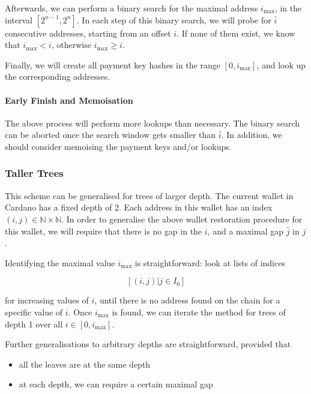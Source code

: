 \documentclass[11pt,a4paper,dvipsnames,twosided]{article}
\begin{document}
Afterwards, we can perform a binary search for the maximal address
\(i_\text{max}\), in the interval \([2^{n-1}, 2^n]\). In each step of
this binary search, we will probe for \(\bar{i}\) consecutive addresses,
starting from an offset \(i\). If none of them exist, we know that
\(i_\text{max} < i\), otherwise \(i_\text{max} \geq i\).

Finally, we will create all payment key hashes in the range
\([0, i_\text{max}]\), and look up the corresponding addresses.

\paragraph{Early Finish and Memoisation}

The above process will perform more lookups than necessary. The binary
search can be aborted once the search window gets smaller than
\(\bar{i}\). In addition, we should consider memoising the payment keys
and/or lookups.

\subsubsection{Taller Trees}
\label{taller-trees}

This scheme can be generalised for trees of larger depth. The current
wallet in Cardano has a fixed depth of 2. Each address in this wallet
has an index \((i, j) \in \mathbb{N} \times \mathbb{N}\). In order to
generalise the above wallet restoration procedure for this wallet, we
will require that there is no gap in the \(i\), and a maximal gap
\(\bar{j}\) in \(j\).

Identifying the maximal value \(i_\text{max}\) is straightforward: look
at lists of indices

\[
[(i, j) | j \in I_0]
\]

for increasing values of \(i\), until there is no address found on the
chain for a specific value of \(i\). Once \(i_\text{max}\) is found, we
can iterate the method for trees of depth 1 over all
\(i \in [0, i_\text{max}]\).

Further generalisations to arbitrary depths are straightforward,
provided that

\begin{itemize}
\item
  all the leaves are at the same depth
\item
  at each depth, we can require a certain maximal gap
\end{itemize}
\end{document}
